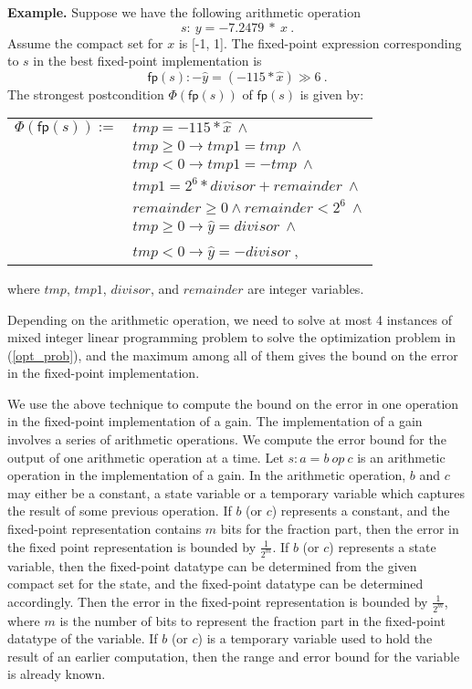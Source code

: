 \documentclass{amsart}
\numberwithin{equation}{section}
\begin{document}
\smallskip
\noindent
{\bf Example.} Suppose we have the following arithmetic operation 
$$s: \ y = -7.2479 \ * \ x \ .$$ 
Assume the compact set for $x$ is [-1, 1]. The fixed-point expression corresponding to $s$ in the best fixed-point implementation is 
$$\mathsf{fp}(s) :  -\hat{y} = (-115 * \hat{x}) \gg 6 \ .$$
The strongest postcondition $\Phi(\mathsf{fp}(s))$ of $\mathsf{fp}(s)$ is given by:\\
\begin{center}
\begin{tabular}{rl}
$\Phi(\mathsf{fp}(s)) :=$ & $tmp = -115 * \hat{x} \ \wedge$ \\
& $tmp \ge  0 \rightarrow tmp1 = tmp \ \wedge$ \\
& $tmp < 0 \rightarrow tmp1 = -tmp \ \wedge$ \\
& $tmp1 = 2^6 * divisor + remainder \ \wedge$ \\ 
& $remainder \ge 0 \wedge remainder < 2^6 \ \wedge$ \\ 
& $tmp \ge 0 \rightarrow \hat{y} = divisor \ \wedge$ \\ 
& $tmp < 0 \rightarrow \hat{y} = - divisor \ $,
\end{tabular}
\end{center}
where $tmp$, $tmp1$, $divisor$, and $remainder$ are integer variables.

Depending on the arithmetic operation, we need to solve at most 4 instances of mixed integer linear
programming problem to solve the optimization problem in (\ref{opt_prob}), and the maximum among all of them gives the bound on the error in the
fixed-point implementation.

We use the above technique to compute the bound on the error in one operation in the 
fixed-point implementation of a gain. The implementation of a gain
involves a series of arithmetic operations. We compute the error bound for the output of one arithmetic operation
at a time. Let $s: a = b \ op \ c$ is an arithmetic operation in the implementation of a gain. In the arithmetic operation,
$b$ and $c$ may either be a constant, a state variable or a temporary variable which captures the result of some
previous operation. If $b$ (or $c$) represents a constant, and the fixed-point representation contains $m$ bits for the 
fraction part, then the error in the fixed point representation is bounded by $\frac{1}{2^m}$. If $b$ (or $c$) represents
a state variable, then the fixed-point datatype can be determined from the given compact set for the state, and the fixed-point
datatype can be determined accordingly. Then the error in the fixed-point representation is bounded by $\frac{1}{2^m}$, where
$m$ is the number of bits to represent the fraction part in the fixed-point datatype of the variable. If  $b$ (or $c$) is a temporary variable used to hold 
the result of an earlier computation, then the range and error bound for the variable is already known.
\end{document}
